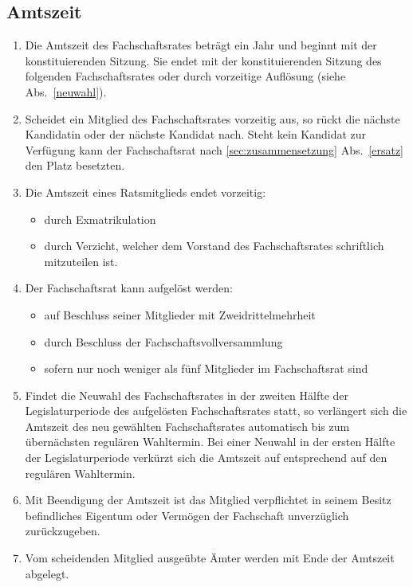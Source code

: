 \subsection{Amtszeit}
\begin{enumerate}
\item Die Amtszeit des Fachschaftsrates beträgt ein Jahr und beginnt mit der konstituierenden Sitzung. Sie endet mit der konstituierenden Sitzung des folgenden Fachschaftsrates oder durch vorzeitige Auflösung (siehe Abs.~\ref{neuwahl}).
\item Scheidet ein Mitglied des Fachschaftsrates vorzeitig aus, so rückt die nächste Kandidatin  oder der nächste Kandidat nach. Steht kein Kandidat zur Verfügung kann der Fachschaftsrat nach \ref{sec:zusammensetzung} Abs.~\ref{ersatz} den Platz besetzten.
\item Die Amtszeit eines Ratsmitglieds endet vorzeitig:
\begin{itemize}
\item durch Exmatrikulation
\item durch Verzicht, welcher dem Vorstand des Fachschaftsrates schriftlich mitzuteilen ist.
\end{itemize}
\item Der Fachschaftsrat kann aufgelöst werden:
\begin{itemize}
\item auf Beschluss seiner Mitglieder mit Zweidrittelmehrheit
\item durch Beschluss der Fachschaftsvollversammlung
\item sofern nur noch weniger als fünf Mitglieder im Fachschaftsrat sind
\end{itemize}
\item \label{neuwahl} Findet die Neuwahl des Fachschaftsrates in der zweiten Hälfte der Legislaturperiode des aufgelösten Fachschaftsrates statt, so verlängert sich die Amtszeit des neu gewählten Fachschaftsrates automatisch bis zum übernächsten regulären Wahltermin. Bei einer Neuwahl in der ersten Hälfte der Legislaturperiode verkürzt sich die Amtszeit auf entsprechend auf den regulären Wahltermin.
\item Mit Beendigung der Amtszeit ist das Mitglied verpflichtet in seinem Besitz befindliches Eigentum oder Vermögen der Fachschaft unverzüglich zurückzugeben.
\item Vom scheidenden Mitglied ausgeübte Ämter werden mit Ende der Amtszeit abgelegt.
\end{enumerate}

